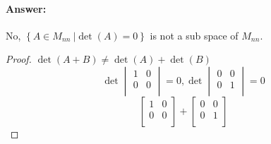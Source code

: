 \documentclass[12pt]{article}
\begin{document}
\begin{enumerate}
\begin{enumerate}
                            \paragraph{Answer:} No, ${ \left\{A \in M_{nn} \
                                                    | \det (A) = 0 \right\}}$ is not a sub space of $M_{nn}$.
                            \begin{proof}
                                    $\det(A+B) \neq \det (A)+\det (B)$
                                    \begin{equation*}
                                            \det
                                            \begin{vmatrix}
                                                    {1} & {0} \\
                                                    {0} & {0} \\
                                            \end{vmatrix}
                                            {= 0},
                                            \det
                                            \begin{vmatrix}
                                                    {0} & {0} \\
                                                    {0} & {1} \\
                                            \end{vmatrix}
                                            = 0
                                    \end{equation*}
                                    \begin{equation*}
                                            \begin{bmatrix}
                                                    {1} & {0} \\
                                                    {0} & {0} \\
                                            \end{bmatrix}
                                            +
                                            \begin{bmatrix}
                                                    {0} & {0} \\
                                                    {0} & {1} \\
                                            \end{bmatrix}

\end{equation*}
\end{proof}
\end{enumerate}
\end{enumerate}
\end{document}
